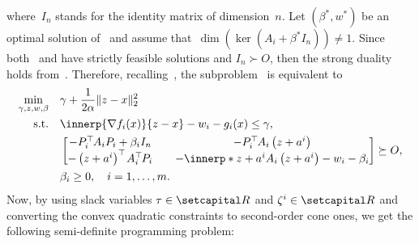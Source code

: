 \documentclass[../../main]{subfiles}
\begin{document}
where~$I_n$ stands for the identity matrix of dimension~$n$.
Let $(\beta^\ast, w^\ast)$ be an optimal solution of~ and assume that~$\dim(\ker(A_i + \beta^\ast I_n)) \neq 1$.
Since both~ and  have strictly feasible solutions and $I_n \succ O$, then the strong duality holds from~\cite[Theorem~3.5]{Beck2006}.
Therefore, recalling~, the subproblem~ is equivalent to
\begin{equation}
    \begin{aligned}
        \min_{\gamma, z, w, \beta} \quad & \gamma + \frac{1}{2 \alpha} \norm{z - x}_2^2                                                            \\
        \st    \quad                     & \innerp{\nabla f_i(x)}{z - x} - w_i - g_i (x) \leq \gamma,                                              \\
                                         & \begin{bmatrix}
                                               -P_i^\T A_i P_i + \beta_i I_n       & \quad -P_i^\T A_i \left(z + a^i\right)                            \\
                                               -\left(z + a^i\right)^\T A_i^\T P_i & \quad -\innerp*{z + a^i}{A_i \left(z + a^i\right)} - w_i -\beta_i
                                           \end{bmatrix}
        \succeq O,                                                                                                                                 \\
                                         & \beta_i \geq 0, \quad i = 1,\dots,m.
    \end{aligned}
\end{equation}
Now, by using slack variables $\tau \in \setR$ and $\zeta^i \in \setR$ and converting the convex quadratic constraints to second-order cone ones, we get the following semi-definite programming problem:
\end{document}

